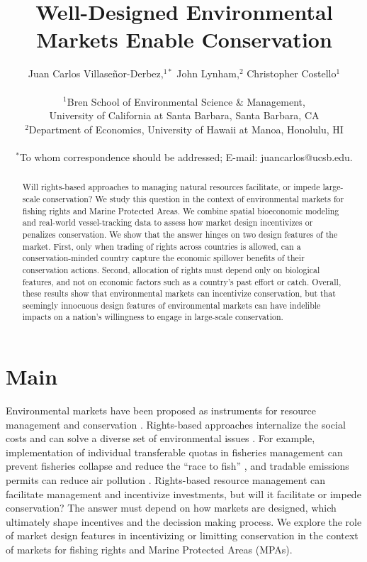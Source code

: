 \documentclass[12pt]{article}
\title{Well-Designed Environmental Markets Enable Conservation}
\author{Juan Carlos Villase\~{n}or-Derbez,$^{1\ast}$ John Lynham,$^{2}$ Christopher Costello$^{1}$\\
\\
\normalsize{$^{1}$Bren School of Environmental Science \& Management,}\\
\normalsize{University of California at Santa Barbara, Santa Barbara, CA}\\
\normalsize{$^{2}$Department of Economics, University of Hawaii at Manoa, Honolulu, HI}\\
\\
\normalsize{$^\ast$To whom correspondence should be addressed; E-mail: juancarlos@ucsb.edu.}
}
\date{}
\begin{document}

\baselineskip24pt


\maketitle



\begin{abstract}
Will rights-based approaches to managing natural resources facilitate, or impede large-scale conservation? We study this question in the context of environmental markets for fishing rights and Marine Protected Areas. We combine spatial bioeconomic modeling and real-world vessel-tracking data to assess how market design incentivizes or penalizes conservation. We show that the answer hinges on two design features of the market. First, only when trading of rights across countries is allowed, can a conservation-minded country capture the economic spillover benefits of their conservation actions. Second, allocation of rights must depend only on biological features, and not on economic factors such as a country's past effort or catch. Overall, these results show that environmental markets can incentivize conservation, but that seemingly innocuous design features of environmental markets can have indelible impacts on a nation's willingness to engage in large-scale conservation.
\end{abstract}

\clearpage

\section{Main}

Environmental markets have been proposed as instruments for resource management and conservation \cite{arsel_2012,sullivan_2013}. Rights-based approaches internalize the social costs and can solve a diverse set of environmental issues \cite{libecap_2009}. For example, implementation of individual transferable quotas in fisheries management can prevent fisheries collapse and reduce the ``race to fish'' \cite{costello_2008,birkenbach_2017}, and tradable emissions permits can reduce air pollution \cite{joskow_1998}. Rights-based resource management can facilitate management and incentivize investments, but will it facilitate or impede conservation? The answer must depend on how markets are designed, which ultimately shape incentives and the decission making process. We explore the role of market design features in incentivizing or limitting conservation in the context of markets for fishing rights and Marine Protected Areas (MPAs).
\end{document}
